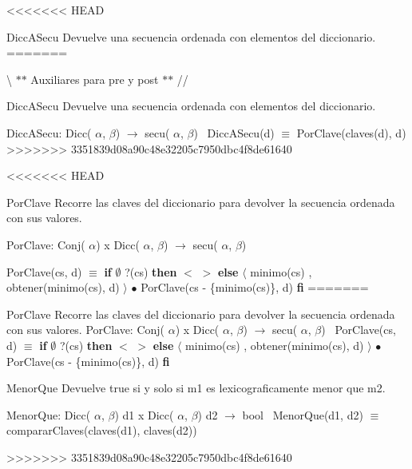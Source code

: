 <<<<<<< HEAD
\begin{DoxyParagraph}{\-Dicc\-A\-Secu}
\-Devuelve una secuencia ordenada con elementos del diccionario.
=======

\textbackslash{} $\ast$$\ast$ Auxiliares para pre y post $\ast$$\ast$ // \begin{DoxyParagraph}{Dicc\+A\+Secu}
Devuelve una secuencia ordenada con elementos del diccionario.

Dicc\+A\+Secu\+: Dicc( $\alpha$, $\beta$) $\to$ secu( $\alpha$, $\beta$)~\newline
Dicc\+A\+Secu(d) $\equiv$ Por\+Clave(claves(d), d) 
>>>>>>> 3351839d08a90c48e32205c7950dbc4f8de61640
\end{DoxyParagraph}

<<<<<<< HEAD
\begin{DoxyParagraph}{\-Por\-Clave}
\-Recorre las claves del diccionario para devolver la secuencia ordenada con sus valores.
\end{DoxyParagraph}
\-Por\-Clave\-: \-Conj( $\alpha$) x \-Dicc( $\alpha$, $\beta$) $\to$ secu( $\alpha$, $\beta$)\par
 \-Por\-Clave(cs, d) $\equiv$ {\bfseries if} $\emptyset$ ?(cs) {\bfseries then} $<$ $>$ {\bfseries else} $\langle$ minimo(cs) , obtener(minimo(cs), d) $\rangle$ $\bullet$ \-Por\-Clave(cs -\/ \{minimo(cs)\}, d) {\bfseries fi} 
=======

\begin{DoxyParagraph}{Por\+Clave}
Recorre las claves del diccionario para devolver la secuencia ordenada con sus valores. Por\+Clave\+: Conj( $\alpha$) x Dicc( $\alpha$, $\beta$) $\to$ secu( $\alpha$, $\beta$)~\newline
Por\+Clave(cs, d) $\equiv$ {\bfseries if} $\emptyset$ ?(cs) {\bfseries then} $<$ $>$ {\bfseries else} $\langle$ minimo(cs) , obtener(minimo(cs), d) $\rangle$ $\bullet$ Por\+Clave(cs -\/ \{minimo(cs)\}, d) {\bfseries fi} 
\end{DoxyParagraph}


\begin{DoxyParagraph}{Menor\+Que}
Devuelve true si y solo si m1 es lexicograficamente menor que m2.

Menor\+Que\+: Dicc( $\alpha$, $\beta$) d1 x Dicc( $\alpha$, $\beta$) d2 $\to$ bool~\newline
Menor\+Que(d1, d2) $\equiv$ comparar\+Claves(claves(d1), claves(d2)) 
\end{DoxyParagraph}

>>>>>>> 3351839d08a90c48e32205c7950dbc4f8de61640


\end{DoxyParagraph}

